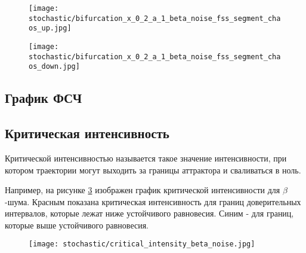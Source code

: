         \begin{figure}
            \centering
            \texttt{[image: stochastic/bifurcation\_x\_0\_2\_a\_1\_beta\_noise\_fss\_segment\_chaos\_up.jpg]}
        
            \captionsetup{justification=centering}
            \caption{}
            \label{bifurcation_x_0_2_a_1_beta_chaos_fss_segment_chaos_up}
        \end{figure}

        \begin{figure}
            \centering
            \texttt{[image: stochastic/bifurcation\_x\_0\_2\_a\_1\_beta\_noise\_fss\_segment\_chaos\_down.jpg]}
        
            \captionsetup{justification=centering}
            \caption{}
            \label{bifurcation_x_0_2_a_1_beta_chaos_fss_segment_chaos_down}
        \end{figure}


    \subsection{График ФСЧ}


    \subsection{Критическая интенсивность}

        Критической интенсивностью называется такое значение интенсивности, при котором траектории могут выходить за границы аттрактора и сваливаться в ноль.

        Например, на рисунке \ref{critical_intensity_beta_noise} изображен график критической интенсивности для \(\beta\)-шума. Красным показана критическая интенсивность для границ доверительных интервалов, которые лежат ниже устойчивого равновесия. Синим - для границ, которые выше устойчивого равновесия. 


        \begin{figure}
            \centering
            \texttt{[image: stochastic/critical\_intensity\_beta\_noise.jpg]}
        
            \captionsetup{justification=centering}
            \caption{}
            \label{critical_intensity_beta_noise}
        \end{figure}
        
